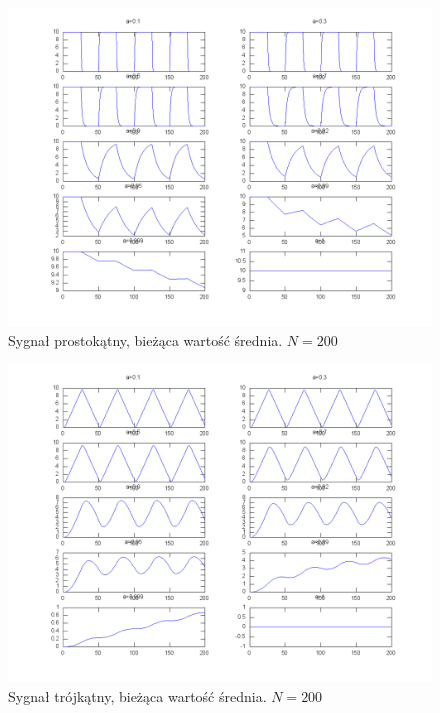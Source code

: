 \documentclass[wide,a4paper,titlepage,12pt]{mwart}
\begin{document}
      \begin{landscape}
        \begin{figure}[htbp]
          \begin{center}
            \includegraphics[scale=.5]{out/Figure5.png}
            \caption{\label{wykres5}Sygnał prostokątny, bieżąca wartość średnia. $N=200$}
          \end{center}
        \end{figure}
      \end{landscape}

      \begin{landscape}
        \begin{figure}[htbp]
          \begin{center}
            \includegraphics[scale=.5]{out/Figure6.png}
            \caption{\label{wykres6}Sygnał trójkątny, bieżąca wartość średnia. $N=200$}
          \end{center}
        \end{figure}
      \end{landscape}
\end{document}
